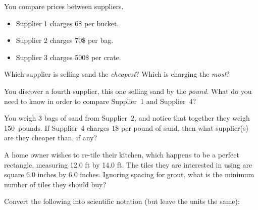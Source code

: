 \documentclass[12pt]{exam}
\begin{document}
\begin{questions}
\begin{parts}
\clearpage
	\item You compare prices between suppliers.
		\begin{itemize}
			\item Supplier 1 charges 6\$ per bucket.
			\item Supplier 2 charges 70\$ per bag.
			\item Supplier 3 charges 500\$ per crate.
		\end{itemize}
		Which supplier is selling sand the \textit{cheapest}? Which is charging the \textit{most}?
	\vspace{1in}
	\item You discover a fourth supplier, this one selling sand by the \textit{pound}. What do you need to know in order to compare Supplier~1 and Supplier~4?
		\vspace{0.4in}
	\item You weigh 3 bags of sand from Supplier~2, and notice that together they weigh 150~pounds. If Supplier~4 charges 1\$ per pound of sand, then what supplier(s) are they cheaper than, if any?
		\vspace{2in}
\end{parts}

\question
A home owner wishes to re-tile their kitchen, which happens to be a perfect rectangle, measuring 12.0 ft by 14.0 ft. The tiles they are interested in using are square 6.0 inches by 6.0 inches. Ignoring spacing for grout, what is the minimum number of tiles they should buy?
\vspace{2in}

\clearpage
\question
Convert the following into scientific notation (but leave the units the same):
\end{questions}
\end{document}
